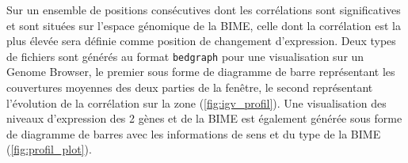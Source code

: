 \documentclass[12pt,a4paper]{report}
\begin{document}
\begin{onehalfspace}
\begin{figure}
\end{figure}

Sur un ensemble de positions consécutives dont les corrélations sont significatives et sont situées sur l'espace génomique de la BIME, celle dont la corrélation est la plus élevée sera définie comme position de changement d'expression. Deux types de fichiers sont générés au format \texttt{bedgraph} pour une visualisation sur un Genome Browser, le premier sous forme de diagramme de barre représentant les couvertures moyennes des deux parties de la fenêtre, le second représentant l'évolution de la corrélation sur la zone (\autoref{fig:igv_profil}). Une visualisation des niveaux d'expression des 2 gènes et de la BIME est également générée sous forme de diagramme de barres avec les informations de sens et du type de la BIME (\autoref{fig:profil_plot}).


\end{onehalfspace}
\end{document}
